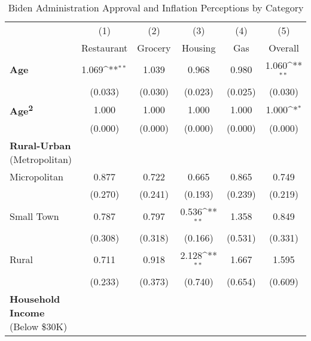 \begin{table}[htbp]\centering \scriptsize

\def\sym#1{\ifmmode^{#1}\else\(^{#1}\)\fi}
\caption{Biden Administration Approval and Inflation Perceptions by Category}
\label{tab:job}
\begin{tabular}{l*{5}{c}}
\hline\hline
                    &\multicolumn{1}{c}{(1)}&\multicolumn{1}{c}{(2)}&\multicolumn{1}{c}{(3)}&\multicolumn{1}{c}{(4)}&\multicolumn{1}{c}{(5)}\\
                    &\multicolumn{1}{c}{Restaurant}&\multicolumn{1}{c}{Grocery}&\multicolumn{1}{c}{Housing}&\multicolumn{1}{c}{Gas}&\multicolumn{1}{c}{Overall}\\
\hline
\textbf{Age}        &       1.069\sym{**} &       1.039         &       0.968         &       0.980         &       1.060\sym{**} \\
                    &     (0.033)         &     (0.030)         &     (0.023)         &     (0.025)         &     (0.030)         \\
\textbf{Age\textsuperscript{2}}&       1.000         &       1.000         &       1.000         &       1.000         &       1.000\sym{*}  \\
                    &     (0.000)         &     (0.000)         &     (0.000)         &     (0.000)         &     (0.000)         \\
\textbf{Rural-Urban} (Metropolitan) &  &  &  &   & \\
Micropolitan        &       0.877         &       0.722         &       0.665         &       0.865         &       0.749         \\
                    &     (0.270)         &     (0.241)         &     (0.193)         &     (0.239)         &     (0.219)         \\
Small Town          &       0.787         &       0.797         &       0.536\sym{**} &       1.358         &       0.849         \\
                    &     (0.308)         &     (0.318)         &     (0.166)         &     (0.531)         &     (0.331)         \\
Rural               &       0.711         &       0.918         &       2.128\sym{**} &       1.667         &       1.595         \\
                    &     (0.233)         &     (0.373)         &     (0.740)         &     (0.654)         &     (0.609)         \\
\textbf{Household Income} (Below \$30K) &  &  &  &   & \\

\end{tabular}
\end{table}

